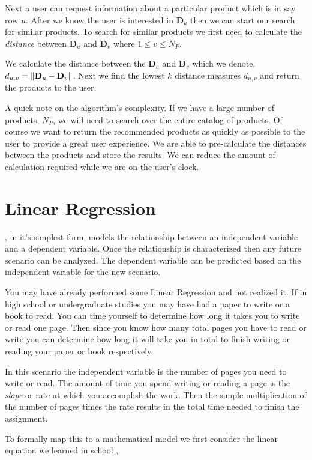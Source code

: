 Next a user can request information about a particular product which is in say row $u$. After we know the user is interested in $\mathbf{D}_u$ then we can start our search for similar products. To search for similar products we first need to calculate the \emph{distance} between $\mathbf{D}_u$ and $\mathbf{D}_v$ where $1 \leq v \leq N_P$. 

We calculate the distance between the $\mathbf{D}_u$ and $\mathbf{D}_v$ which we denote, $d_{u,v} = \| \mathbf{D}_u-\mathbf{D}_v \|$. Next we find the lowest $k$ distance measures $d_{u,v}$ and return the products to the user. 

A quick note on the algorithm's complexity. If we have a large number of products, $N_P$, we will need to search over the entire catalog of products. Of course we want to return the recommended products as quickly as possible to the user to provide a great user experience. We are able to pre-calculate the distances between the products and store the results. We can reduce the amount of calculation required while we are on the user's clock. 
	
\section{Linear Regression}
	
, in it's simplest form, models the relationship between an independent variable and a dependent variable. Once the relationship is characterized then any future scenario can be analyzed. The dependent variable can be predicted based on the independent variable for the new scenario. 

You may have already performed some Linear Regression and not realized it. If in high school or undergraduate studies you may have had a paper to write or a book to read. You can time yourself to determine how long it takes you to write or read one page. Then since you know how many total pages you have to read or write you can determine how long it will take you in total to finish writing or reading your paper or book respectively. 

In this scenario the independent variable is the number of pages you need to write or read. The amount of time you spend writing or reading a page is the \emph{slope} or rate at which you accomplish the work. Then the simple multiplication of the number of pages times the rate results in the total time needed to finish the assignment. 

To formally map this to a mathematical model we first consider the linear equation we learned in school \cite{boa06},

